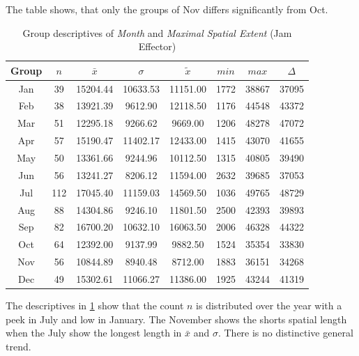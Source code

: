 The table shows, that only the groups of Nov differs significantly from Oct.
\begin{table}[ht!]
	\tiny
	\centering
	\begin{tabular}{c|c|c|c|c|c|c|c}
		\toprule
		Group & $n$ & $\bar{x}$ & $\sigma$ & $\tilde{x}$ & $min$ & $max$ & $\Delta$ \\
		\midrule
		Jan & 39  & 15204.44 & 10633.53 & 11151.00 & 1772 & 38867 & 37095 \\ 
		Feb & 38  & 13921.39 & 9612.90  & 12118.50 & 1176 & 44548 & 43372 \\ 
		Mar & 51  & 12295.18 & 9266.62  & 9669.00  & 1206 & 48278 & 47072 \\ 
		Apr & 57  & 15190.47 & 11402.17 & 12433.00 & 1415 & 43070 & 41655 \\ 
		May & 50  & 13361.66 & 9244.96  & 10112.50 & 1315 & 40805 & 39490 \\ 
		Jun & 56  & 13241.27 & 8206.12  & 11594.00 & 2632 & 39685 & 37053 \\ 
		Jul & 112 & 17045.40 & 11159.03 & 14569.50 & 1036 & 49765 & 48729 \\ 
		Aug & 88  & 14304.86 & 9246.10  & 11801.50 & 2500 & 42393 & 39893 \\ 
		Sep & 82  & 16700.20 & 10632.10 & 16063.50 & 2006 & 46328 & 44322 \\ 
		Oct & 64  & 12392.00 & 9137.99  & 9882.50  & 1524 & 35354 & 33830 \\ 
		Nov & 56  & 10844.89 & 8940.48  & 8712.00  & 1883 & 36151 & 34268 \\ 
		Dec & 49  & 15302.61 & 11066.27 & 11386.00 & 1925 & 43244 & 41319 \\ 
		\bottomrule
	\end{tabular}
    \caption{Group descriptives of \textit{Month} and \textit{Maximal Spatial Extent} (Jam Effector)}
    \label{tbl:descriptives_baysis_effector_Month_SMax}
\end{table}
The descriptives in \cref{tbl:descriptives_baysis_effector_Month_SMax} show that the count $n$ is distributed over the year with a peek in July and low in January. The November shows the shorts spatial length when the July show the longest length in $\bar{x}$ and $\sigma$. There is no distinctive general trend.

